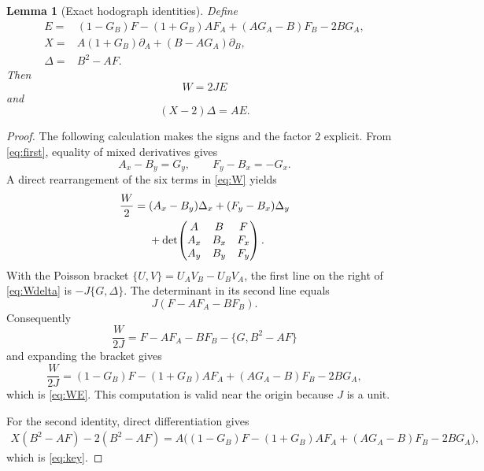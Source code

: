 \documentclass[11pt]{article}
\newtheorem{lemma}[theorem]{Lemma}
\theoremstyle{remark}
\begin{document}
\begin{lemma}[Exact hodograph identities]                         \label{lem:identities}
Define
\begin{align}
 E={}&(1-G_B)F-(1+G_B)AF_A+(AG_A-B)F_B-2BG_A,          \label{eq:E}\\
 X={}&A(1+G_B)\partial_A+(B-AG_A)\partial_B,           \label{eq:X}\\
 \Delta={}&B^2-AF.                                    \label{eq:Delta}
\end{align}
Then
\begin{equation}
                         W=2J E                                      \label{eq:WE}
\end{equation}
and
\begin{equation}
                         (X-2)\Delta=A E.                             \label{eq:key}
\end{equation}
\end{lemma}

\begin{proof}
The following calculation makes the signs and the factor \(2\) explicit.
From \eqref{eq:first}, equality of mixed derivatives gives
\[
                         A_x-B_y=G_y,
        \qquad          F_y-B_x=-G_x.                              \label{eq:compat}
\]
A direct rearrangement of the six terms in \eqref{eq:W} yields
\begin{align}
 \frac W2={}&(A_x-B_y)\Delta_x+(F_y-B_x)\Delta_y \notag\\
 &+\det\!\begin{pmatrix}
 A&B&F\\ A_x&B_x&F_x\\ A_y&B_y&F_y
 \end{pmatrix}.                                                    \label{eq:Wdelta}
\end{align}
With the Poisson bracket
\(\{U,V\}=U_AV_B-U_BV_A\), the first line on the right of
\eqref{eq:Wdelta} is \(-J\{G,\Delta\}\).  The determinant in its second
line equals
\[
                         J(F-AF_A-BF_B).
\]
Consequently
\[
 \frac{W}{2J}=F-AF_A-BF_B-\{G,B^2-AF\}
\]
and expanding the bracket gives
\[
 \frac{W}{2J}=(1-G_B)F-(1+G_B)AF_A
                    +(AG_A-B)F_B-2BG_A,
\]
which is \eqref{eq:WE}.  This computation is valid near the origin because
\(J\) is a unit.

For the second identity, direct differentiation gives
\begin{align*}
 X(B^2-AF)-2(B^2-AF)
  =A\bigl((1-G_B)F-(1+G_B)AF_A
                    +(AG_A-B)F_B-2BG_A\bigr),
\end{align*}
which is \eqref{eq:key}.
\end{proof}
\end{document}
